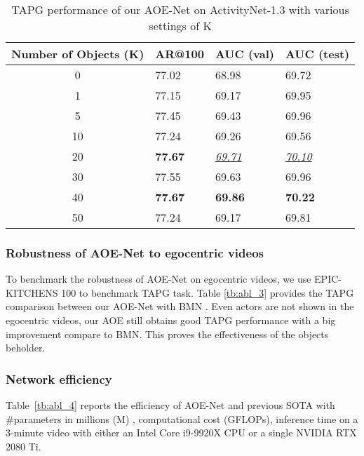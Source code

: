\documentclass[sn-mathphys]{sn-jnl}
\theoremstyle{thmstyleone}\newtheorem{theorem}{Theorem}\newtheorem{proposition}[theorem]{Proposition}
\theoremstyle{thmstyletwo}\newtheorem{example}{Example}\newtheorem{remark}{Remark}
\theoremstyle{thmstylethree}\newtheorem{definition}{Definition}
\begin{document}
\begin{table}[!t]
\centering
\begin{tabular}{c|lll}
Number of Objects (K) & AR@100 & AUC (val) & AUC (test) \\
\hline \hline
0  & 77.02 & 68.98 & 69.72 \\
1  & 77.15 & 69.17 & 69.95 \\
5  & 77.45 & 69.43 & 69.96 \\
10 & 77.24 & 69.26 & 69.56 \\
20 & \textbf{77.67} & \underline{\textit{69.71}} & \underline{\textit{70.10}} \\
30 & 77.55 & 69.63 & 69.96 \\ 40 & \textbf{77.67} & \textbf{69.86} & \textbf{70.22} \\
50 & 77.24 & 69.17 & 69.81 \\
\bottomrule
\end{tabular}
\caption{TAPG performance of our AOE-Net on ActivityNet-1.3 \cite{caba2015activitynet} with various settings of K} \label{tb:num_objects}
\end{table}

\subsubsection{Robustness of AOE-Net to egocentric videos}
To benchmark the robustness of AOE-Net on egocentric videos, we use EPIC-KITCHENS 100 \cite{damen2021rescaling} to benchmark TAPG task. Table \ref{tb:abl_3} provides the TAPG comparison between our AOE-Net with BMN \cite{bmn}. Even actors are not shown in the egocentric videos, our AOE still obtains good TAPG performance with a big improvement compare to BMN. This proves the effectiveness of the objects beholder.


\subsubsection{Network efficiency}
Table~\ref{tb:abl_4} reports the efficiency of AOE-Net and previous SOTA with \#parameters in millions (M) , computational cost (GFLOPs), inference time on a 3-minute video with either an Intel Core i9-9920X CPU or a single NVIDIA RTX 2080 Ti.
\end{document}

